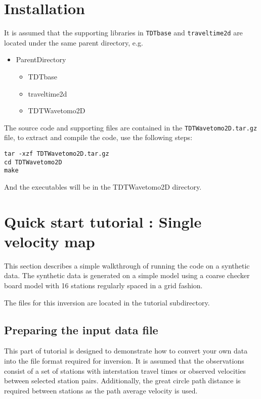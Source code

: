 \documentclass[a4paper,12pt]{article}
\begin{document}
\section{Installation}

It is assumed that the supporting libraries in {\tt TDTbase} and {\tt traveltime2d} are
located under the same parent directory, e.g.

\begin{itemize}
\item ParentDirectory
  \begin{itemize}
  \item TDTbase
  \item traveltime2d
  \item TDTWavetomo2D
  \end{itemize}
\end{itemize}

The source code and supporting files are contained in the {\tt TDTWavetomo2D.tar.gz}
file, to extract and compile the code, use the following steps:

\begin{verbatim}
tar -xzf TDTWavetomo2D.tar.gz
cd TDTWavetomo2D
make
\end{verbatim}

And the executables will be in the TDTWavetomo2D directory.

\section{Quick start tutorial : Single velocity map}

This section describes a simple walkthrough of running the code on
a synthetic data. The synthetic data is generated on a simple
model using a coarse checker board model with 16 stations regularly
spaced in a grid fashion.

The files for this inversion are located in the tutorial subdirectory.

\subsection{Preparing the input data file}

This part of tutorial is designed to demonstrate how to convert your
own data into the file format required for inversion. It is assumed
that the observations consist of a set of stations with interstation
travel times or observed velocities between selected station
pairs. Additionally, the great circle path distance is required between
stations as the path average velocity is used.
\end{document}
